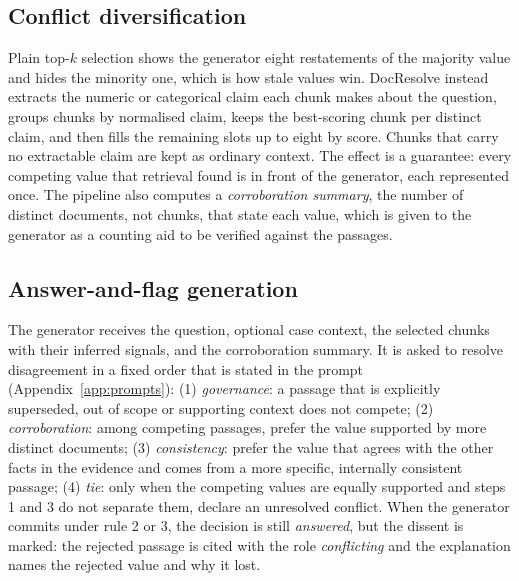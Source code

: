 \documentclass[11pt]{article}
\newcommand{\sysname}{DocResolve}   %
\begin{document}
\subsection{Conflict diversification}
Plain top-$k$ selection shows the generator eight restatements of the
majority value and hides the minority one, which is how stale values win.
\sysname{} instead extracts the numeric or categorical claim each chunk
makes about the question, groups chunks by normalised claim, keeps the
best-scoring chunk per distinct claim, and then fills the remaining slots
up to eight by score. Chunks that carry no extractable claim are kept as
ordinary context. The effect is a guarantee: every competing value that
retrieval found is in front of the generator, each represented once. The
pipeline also computes a \emph{corroboration summary}, the number of
distinct documents, not chunks, that state each value, which is given to
the generator as a counting aid to be verified against the passages.

\subsection{Answer-and-flag generation}
\label{sec:policy}
The generator receives the question, optional case context, the selected
chunks with their inferred signals, and the corroboration summary. It is
asked to resolve disagreement in a fixed order that is stated in the prompt
(Appendix~\ref{app:prompts}): (1) \emph{governance}: a passage that is
explicitly superseded, out of scope or supporting context does not compete;
(2) \emph{corroboration}: among competing passages, prefer the value
supported by more distinct documents; (3) \emph{consistency}: prefer the
value that agrees with the other facts in the evidence and comes from a
more specific, internally consistent passage; (4) \emph{tie}: only when the
competing values are equally supported and steps 1 and 3 do not separate
them, declare an unresolved conflict. When the generator commits under
rule 2 or 3, the decision is still \emph{answered}, but the dissent is
marked: the rejected passage is cited with the role \emph{conflicting} and
the explanation names the rejected value and why it lost.
\end{document}
